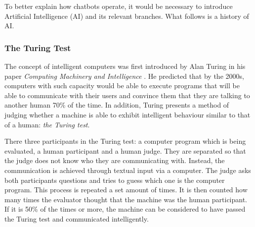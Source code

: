 \documentclass[12pt,a4paper]{article}
\begin{document}
%

To better explain how chatbots operate, it would be necessary to introduce Artificial Intelligence (AI) and its relevant branches. What follows is a history of AI.

\subsubsection{The Turing Test}
The concept of intelligent computers was first introduced by Alan Turing in his paper \textit{Computing Machinery and Intelligence} \citep{Turing1950}. He predicted that by the 2000s, computers with such capacity would be able to execute programs that will be able to communicate with their users and convince them that they are talking to another human 70\% of the time. In addition, Turing presents a method of judging whether a machine is able to exhibit intelligent behaviour similar to that of a human: \textit{the Turing test}. 

There three participants in the Turing test: a computer program which is being evaluated, a human participant and a human judge. They are separated so that the judge does not know who they are communicating with. Instead, the communication is achieved through textual input via a computer. The judge asks both participants questions and tries to guess which one is the computer program. This process is repeated a set amount of times. It is then counted how many times the evaluator thought that the machine was the human participant. If it is 50\% of the times or more, the machine can be considered to have passed the Turing test and communicated intelligently.

\end{document}
